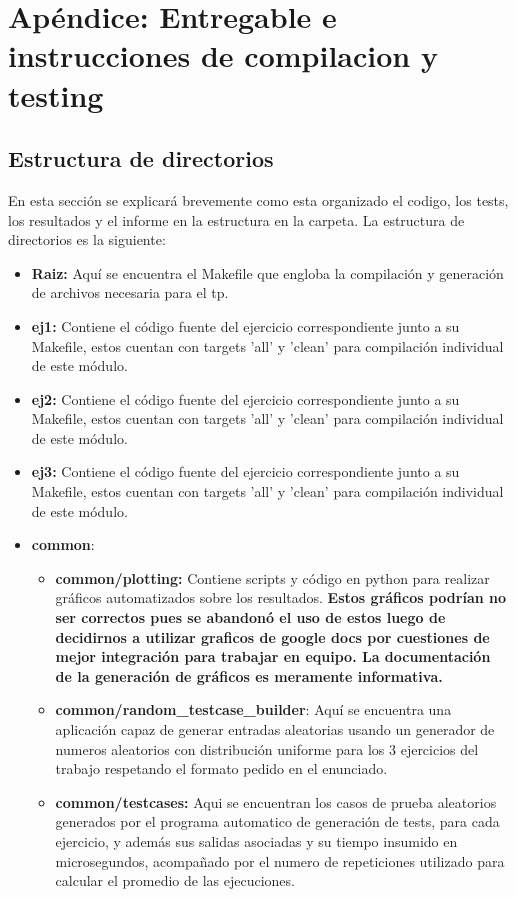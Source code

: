 \section{Ap\'endice: Entregable e instrucciones de compilacion y testing}
\subsection{Estructura de directorios}
En esta secci\'on se explicar\'a brevemente como esta organizado el codigo, los tests, los resultados y el informe en la estructura en la carpeta.
La estructura de directorios es la siguiente:
\begin{itemize}
	\item \textbf{Raiz: } Aqu\'i se encuentra el Makefile que engloba la compilaci\'on y generaci\'on de archivos necesaria para el tp.		
	\item \textbf{ej1:} Contiene el c\'odigo fuente del ejercicio correspondiente junto a su Makefile, estos cuentan con targets 'all' y 'clean' para compilaci\'on individual de este m\'odulo.
	\item \textbf{ej2:} Contiene el c\'odigo fuente del ejercicio correspondiente junto a su Makefile, estos cuentan con targets 'all' y 'clean' para compilaci\'on individual de este m\'odulo.
	\item \textbf{ej3:} Contiene el c\'odigo fuente del ejercicio correspondiente junto a su Makefile, estos cuentan con targets 'all' y 'clean' para compilaci\'on individual de este m\'odulo.
	\item \textbf{common}:
		\begin{itemize}
			\item \textbf{common/plotting:} Contiene scripts y c\'odigo en python para realizar gr\'aficos automatizados sobre los resultados. \textbf{Estos gr\'aficos podr\'ian no ser correctos pues se abandon\'o el uso de estos luego de decidirnos a utilizar graficos de google docs por cuestiones de mejor integraci\'on para trabajar en equipo. La documentaci\'on de la generaci\'on de gr\'aficos es meramente informativa.}
			\item \textbf{common/random\_testcase\_builder}: Aqu\'i se encuentra una aplicaci\'on capaz de generar entradas aleatorias usando un generador de numeros aleatorios con distribuci\'on uniforme para los 3 ejercicios del trabajo respetando el formato pedido en el enunciado.
			\item \textbf{common/testcases:} Aqui se encuentran los casos de prueba aleatorios generados por el programa automatico de generaci\'on de tests, para cada ejercicio, y adem\'as sus salidas asociadas y su tiempo insumido en microsegundos, acompa\~nado por el numero de repeticiones utilizado para calcular el promedio de las ejecuciones.

\end{itemize}
\end{itemize}
